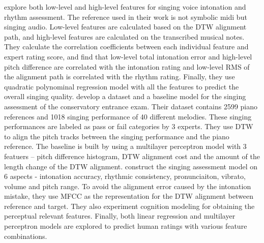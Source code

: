  explore both low-level and high-level features for singing voice intonation and rhythm assessment. The reference used in their work is not symbolic midi but singing audio. Low-level features are calculated based on the DTW alignment path, and high-level features are calculated on the transcribed musical notes. They calculate the correlation coefficients between each individual feature and expert rating score, and find that low-level total intonation error and high-level pitch difference are correlated with the intonation rating and low-level RMS of the alignment path is correlated with the rhythm rating. Finally, they use quadratic polynominal regression model with all the features to predict the overall singing quality.  develop a dataset and a baseline model for the singing assessment of the conservatory entrance exam. Their dataset contains 2599 piano references and 1018 singing performance of 40 different melodies. These singing performances are labeled as pass or fail categories by 3 experts. They use DTW to align the pitch tracks between the singing performance and the piano reference. The baseline is built by using a multilayer perceptron model with 3 featuers -- pitch difference histogram, DTW alignment cost and the amount of the length change of the DTW alignment.  construct the singing assessment model on 6 aspects - intonation accuracy, rhythmic consistency, pronunciaiton, vibrato, volume and pitch range. To avoid the alignment error caused by the intonation mistake, they use MFCC as the representation for the DTW alignment between reference and target. They also experiment cognition modeling for obtaining the perceptual relevant features. Finally, both linear regression and multilayer perceptron models are explored to predict human ratings with various feature combinations.

